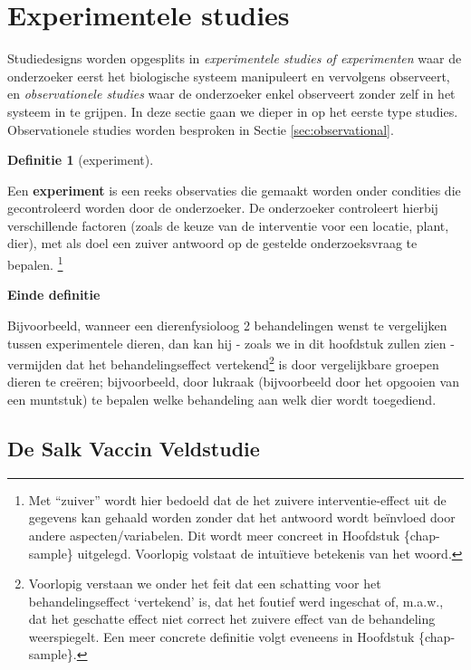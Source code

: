 \documentclass[
  12pt,dutch,coursenotes]{book}
\theoremstyle{definition}
\newtheorem{definition}{Definitie}[chapter]
\theoremstyle{definition}
\theoremstyle{definition}
\theoremstyle{definition}
\theoremstyle{remark}
\begin{document}
\hypertarget{experimentele-studies}{%
\section{Experimentele studies}\label{experimentele-studies}}

Studiedesigns worden opgesplits in \emph{experimentele studies of experimenten} waar de onderzoeker eerst het biologische systeem manipuleert en vervolgens observeert, en \emph{observationele studies} waar de onderzoeker enkel observeert zonder zelf in het systeem in te grijpen. In deze sectie gaan we dieper in op het eerste type studies. Observationele studies worden besproken in Sectie \ref{sec:observational}.

\begin{definition}[experiment]
\protect\hypertarget{def:unnamed-chunk-64}{}{\label{def:unnamed-chunk-64} {} }
\end{definition}
Een \textbf{experiment} is een reeks observaties die gemaakt worden onder
condities die gecontroleerd worden door de onderzoeker. De onderzoeker
controleert hierbij verschillende factoren (zoals de keuze van de
interventie voor een locatie, plant, dier), met als doel een zuiver antwoord op de gestelde onderzoeksvraag te bepalen.
\footnote{Met ``zuiver'' wordt hier bedoeld dat de het zuivere interventie-effect uit de gegevens
  kan gehaald worden zonder dat het antwoord wordt beïnvloed door andere aspecten/variabelen. Dit wordt meer concreet in Hoofdstuk \{chap-sample\}
  uitgelegd. Voorlopig volstaat de intuïtieve betekenis van het woord.}

\textbf{Einde definitie}

Bijvoorbeeld, wanneer een dierenfysioloog 2 behandelingen wenst te vergelijken tussen experimentele dieren,
dan kan hij - zoals we in dit hoofdstuk zullen zien - vermijden dat het
behandelingseffect vertekend\footnote{ Voorlopig verstaan we onder het feit dat een schatting voor het
  behandelingseffect `vertekend' is, dat het foutief werd ingeschat of, m.a.w., dat het geschatte effect niet correct het zuivere effect van de behandeling weerspiegelt. Een meer concrete definitie volgt eveneens in
  Hoofdstuk \{chap-sample\}.} is door vergelijkbare groepen dieren te creëren;
bijvoorbeeld, door lukraak (bijvoorbeeld door
het opgooien van een muntstuk) te bepalen welke behandeling aan welk
dier wordt toegediend.

\hypertarget{de-salk-vaccin-veldstudie}{%
\subsection{De Salk Vaccin Veldstudie}\label{de-salk-vaccin-veldstudie}}
\end{document}
